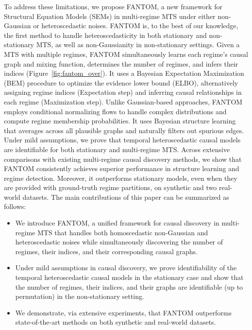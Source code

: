 To address these limitations, we propose FANTOM, a new framework for Structural Equation Models (SEMs) in multi-regime MTS under either non-Gaussian or heteroscedastic noises. FANTOM is, to the best of our knowledge, the first method to handle heteroscedasticity in both stationary and non-stationary MTS, as well as non-Gaussianity in non-stationary settings. Given a MTS with multiple regimes, FANTOM simultaneously learns each regime’s causal graph and mixing function, determines the number of regimes, and infers their indices (Figure~\ref{fig:fantom_over}). It uses a Bayesian Expectation Maximization (BEM) \citep{friedman2013bayesian} procedure to optimize the evidence lower bound (ELBO), alternatively assigning regime indices (Expectation step) and inferring causal relationships in each regime (Maximization step). Unlike Gaussian-based approaches, FANTOM employs conditional normalizing flows \citep{friedman2013bayesian}  to handle complex distributions and compute regime membership probabilities. It uses Bayesian structure learning that averages across all plausible graphs and naturally filters out spurious edges. Under mild assumptions, we prove that temporal heteroscedastic causal models are identifiable for both stationary and multi-regime MTS. Across extensive comparisons with existing multi-regime causal discovery methods, we show that FANTOM consistently achieves superior performance in structure learning and regime detection. Moreover, it outperforms stationary models, even when they are provided with ground-truth regime partitions, on synthetic and two real-world datasets. The main contributions of this paper can be summarized as follows: 
\begin{itemize}
\item We introduce FANTOM, a unified framework for causal discovery in multi-regime MTS that handles both homoscedastic non-Gaussian and heteroscedastic noises while simultaneously discovering the number of regimes, their indices, and their corresponding causal graphs.
\item Under mild assumptions in causal discovery, we prove identifiability of the temporal heteroscedastic causal models in the stationary case and show that the number of regimes, their indices, and their graphs are identifiable (up to permutation) in the non-stationary setting.
\item We demonstrate, via extensive experiments, that FANTOM outperforms state-of-the-art methods on both synthetic and real-world datasets.
\end{itemize}
